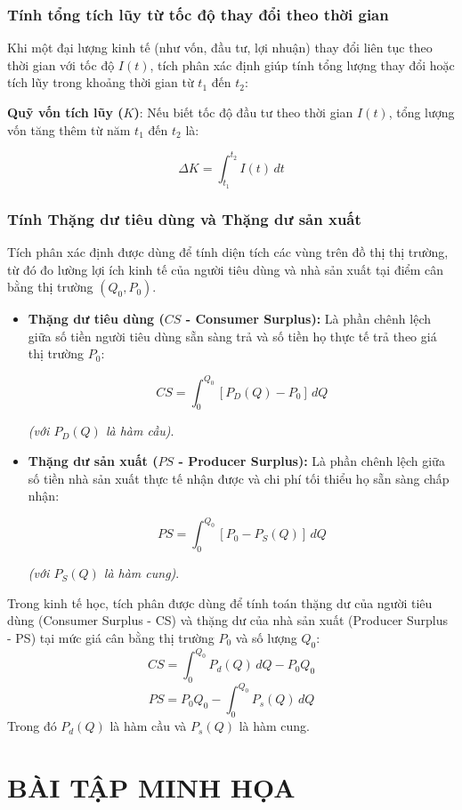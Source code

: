 \documentclass[12pt,a4paper,oneside]{book}
\theoremstyle{theorem}
\theoremstyle{definition}
\begin{document}
\subsection{Tính tổng tích lũy từ tốc độ thay đổi theo thời gian}

Khi một đại lượng kinh tế (như vốn, đầu tư, lợi nhuận) thay đổi liên tục theo thời gian với tốc độ $I(t)$, tích phân xác định giúp tính tổng lượng thay đổi hoặc tích lũy trong khoảng thời gian từ $t_1$ đến $t_2$:
 
 \textbf{Quỹ vốn tích lũy ($K$)}: Nếu biết tốc độ đầu tư theo thời gian $I(t)$, tổng lượng vốn tăng thêm từ năm $t_1$ đến $t_2$ là:
  
        \[\Delta K = \int_{t_1}^{t_2} I(t) \, dt\]

\subsection{Tính Thặng dư tiêu dùng và Thặng dư sản xuất}
Tích phân xác định được dùng để tính diện tích các vùng trên đồ thị thị trường, từ đó đo lường lợi ích kinh tế của người tiêu dùng và nhà sản xuất tại điểm cân bằng thị trường $(Q_0, P_0)$.

\begin{itemize}
    \item \textbf{Thặng dư tiêu dùng ($CS$ - Consumer Surplus):} Là phần chênh lệch giữa số tiền người tiêu dùng sẵn sàng trả và số tiền họ thực tế trả theo giá thị trường $P_0$:
    
        \[CS = \int_{0}^{Q_0} [P_D(Q) - P_0] \, dQ\]
    
    \textit{(với $P_D(Q)$ là hàm cầu)}.

    \item \textbf{Thặng dư sản xuất ($PS$ - Producer Surplus):} Là phần chênh lệch giữa số tiền nhà sản xuất thực tế nhận được và chi phí tối thiểu họ sẵn sàng chấp nhận:
    
        \[PS = \int_{0}^{Q_0} [P_0 - P_S(Q)] \, dQ\]
    
    \textit{(với $P_S(Q)$ là hàm cung)}.
\end{itemize}

Trong kinh tế học, tích phân được dùng để tính toán thặng dư của người tiêu dùng (Consumer Surplus - CS) và thặng dư của nhà sản xuất (Producer Surplus - PS) tại mức giá cân bằng thị trường $P_0$ và số lượng $Q_0$:
\[
CS = \int_{0}^{Q_0} P_d(Q) \, dQ - P_0 Q_0
\]
\[
PS = P_0 Q_0 - \int_{0}^{Q_0} P_s(Q) \, dQ
\]
Trong đó $P_d(Q)$ là hàm cầu và $P_s(Q)$ là hàm cung.
\chapter{BÀI TẬP MINH HỌA}
\end{document}
